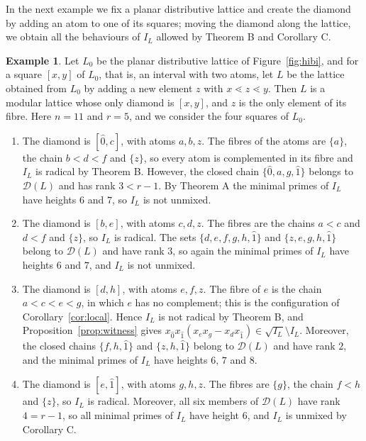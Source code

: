 \documentclass{amsart}
\theoremstyle{definition}
\newtheorem{example}[theorem]{Example}
\newcommand{\cD}{\mathcal D}
\begin{document}
In the next example we fix a planar distributive lattice and create the diamond by adding an atom to one of its squares; moving the diamond along the lattice, we obtain all the behaviours of $I_L$ allowed by Theorem B and Corollary C.

\begin{example}\label{ex:hibi}
	Let $L_0$ be the planar distributive lattice of Figure~\ref{fig:hibi}, and for a square $[x,y]$ of $L_0$, that is, an interval with two atoms, let $L$ be the lattice obtained from $L_0$ by adding a new element $z$ with $x\lessdot z\lessdot y$. Then $L$ is a modular lattice whose only diamond is $[x,y]$, and $z$ is the only element of its fibre. Here $n=11$ and $r=5$, and we consider the four squares of $L_0$.
	\begin{enumerate}
		\item[(1)] The diamond is $[\hat0,c]$, with atoms $a,b,z$. The fibres of the atoms are $\{a\}$, the chain $b<d<f$ and $\{z\}$, so every atom is complemented in its fibre and $I_L$ is radical by Theorem B. However, the closed chain $\{\hat0,a,g,\hat1\}$ belongs to $\cD(L)$ and has rank $3<r-1$. By Theorem A the minimal primes of $I_L$ have heights $6$ and $7$, so $I_L$ is not unmixed.
		\item[(2)] The diamond is $[b,e]$, with atoms $c,d,z$. The fibres are the chains $a<c$ and $d<f$ and $\{z\}$, so $I_L$ is radical. The sets $\{d,e,f,g,h,\hat1\}$ and $\{z,e,g,h,\hat1\}$ belong to $\cD(L)$ and have rank $3$, so again the minimal primes of $I_L$ have heights $6$ and $7$, and $I_L$ is not unmixed.
		\item[(3)] The diamond is $[d,h]$, with atoms $e,f,z$. The fibre of $e$ is the chain $a<c<e<g$, in which $e$ has no complement; this is the configuration of Corollary~\ref{cor:local}. Hence $I_L$ is not radical by Theorem B, and Proposition~\ref{prop:witness} gives $x_{\hat0}x_{\hat1}(x_ex_g-x_dx_{\hat1})\in\sqrt{I_L}\setminus I_L$. Moreover, the closed chains $\{f,h,\hat1\}$ and $\{z,h,\hat1\}$ belong to $\cD(L)$ and have rank $2$, and the minimal primes of $I_L$ have heights $6$, $7$ and $8$.
		\item[(4)] The diamond is $[e,\hat1]$, with atoms $g,h,z$. The fibres are $\{g\}$, the chain $f<h$ and $\{z\}$, so $I_L$ is radical. Moreover, all six members of $\cD(L)$ have rank $4=r-1$, so all minimal primes of $I_L$ have height $6$, and $I_L$ is unmixed by Corollary C.
	\end{enumerate}
\end{example}
\end{document}
